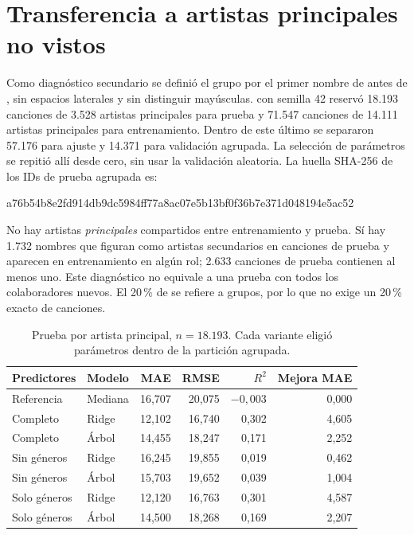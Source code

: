 \section{Transferencia a artistas principales no vistos}

Como diagnóstico secundario se definió el grupo por el primer nombre de
 antes de \code{;}, sin espacios laterales y sin distinguir
mayúsculas.  con semilla 42 reservó 18.193 canciones de
3.528 artistas principales para prueba y 71.547 canciones de 14.111 artistas
principales para entrenamiento. Dentro de este último se separaron 57.176 para
ajuste y 14.371 para validación agrupada. La selección de parámetros se repitió
allí desde cero, sin usar la validación aleatoria. La huella SHA-256 de los IDs
de prueba agrupada es:

{\footnotesize\ttfamily\noindent a76b54b8e2fd914db9dc5984ff77a8ac07e5b13bf0f36b7e371d048194e5ac52\par}

No hay artistas \emph{principales} compartidos entre entrenamiento y prueba. Sí
hay 1.732 nombres que figuran como artistas secundarios en canciones de prueba y
aparecen en entrenamiento en algún rol; 2.633 canciones de prueba contienen al
menos uno. Este diagnóstico no equivale a una prueba con todos los colaboradores
nuevos. El 20\,\% de  se refiere a grupos, por lo que no
exige un 20\,\% exacto de canciones.

\begin{table}[htbp]
\centering\small
\begin{tabular}{llrrrr}
\toprule
Predictores & Modelo & MAE & RMSE & $R^2$ & Mejora MAE \\
\midrule
Referencia & Mediana & 16,707 & 20,075 & $-0,003$ & 0,000 \\
Completo & Ridge & 12,102 & 16,740 & 0,302 & 4,605 \\
Completo & Árbol & 14,455 & 18,247 & 0,171 & 2,252 \\
Sin géneros & Ridge & 16,245 & 19,855 & 0,019 & 0,462 \\
Sin géneros & Árbol & 15,703 & 19,652 & 0,039 & 1,004 \\
Solo géneros & Ridge & 12,120 & 16,763 & 0,301 & 4,587 \\
Solo géneros & Árbol & 14,500 & 18,268 & 0,169 & 2,207 \\
\bottomrule
\end{tabular}
\caption{Prueba por artista principal, $n=18.193$. Cada variante eligió parámetros dentro de la partición agrupada.}
\label{tab:artist-test}
\end{table}

